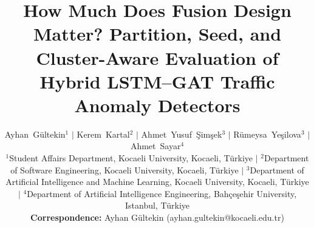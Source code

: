 \documentclass[journal]{IEEEtran}
\begin{document}
\raggedbottom

\title{How Much Does Fusion Design Matter? Partition, Seed, and Cluster-Aware Evaluation of Hybrid LSTM--GAT Traffic Anomaly Detectors}

\author{
    Ayhan~Gültekin$^{1}$ $|$ Kerem~Kartal$^{2}$ $|$ Ahmet~Yusuf~Şimşek$^{3}$ $|$ Rümeysa~Yeşilova$^{3}$ $|$ Ahmet~Sayar$^{4}$ \\[2ex]
    \small
    $^{1}$Student Affairs Department, Kocaeli University, Kocaeli, Türkiye $|$
    $^{2}$Department of Software Engineering, Kocaeli University, Kocaeli, Türkiye $|$
    $^{3}$Department of Artificial Intelligence and Machine Learning, Kocaeli University, Kocaeli, Türkiye $|$
    $^{4}$Department of Artificial Intelligence Engineering, Bahçeşehir University, Istanbul, Türkiye \\[1.5ex]
    \textbf{Correspondence:} Ayhan Gültekin (ayhan.gultekin@kocaeli.edu.tr)
}

\maketitle
\end{document}
